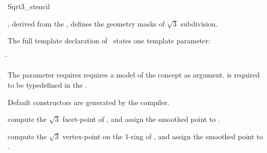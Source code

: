 \begin{ccRefClass}{Sqrt3_stencil}

\ccDefinition

\ccClassTemplateName , derived from the , 
defines the geometry masks of $\sqrt{3}$ subdivision. 


\ccParameters

The full template declaration of \ccClassTemplateName\ states one
template parameter:

\begin{tabbing}
 \= 
\end{tabbing}
   
The  parameter requires requires a model of 
the  concept as argument. 
 is required to be typedefined in the 
.

\ccCreation

Default constructors are generated by the compiler.

\ccThree{}{}{}

{compute the $\sqrt{3}$ facet-point of , and assign 
the smoothed point to .}

{compute the $\sqrt{3}$ vertex-point on the 1-ring of , 
and assign the smoothed point to .}


\ccSeeAlso

\\
\\
\\

\end{ccRefClass}

\ccRefPageEnd


